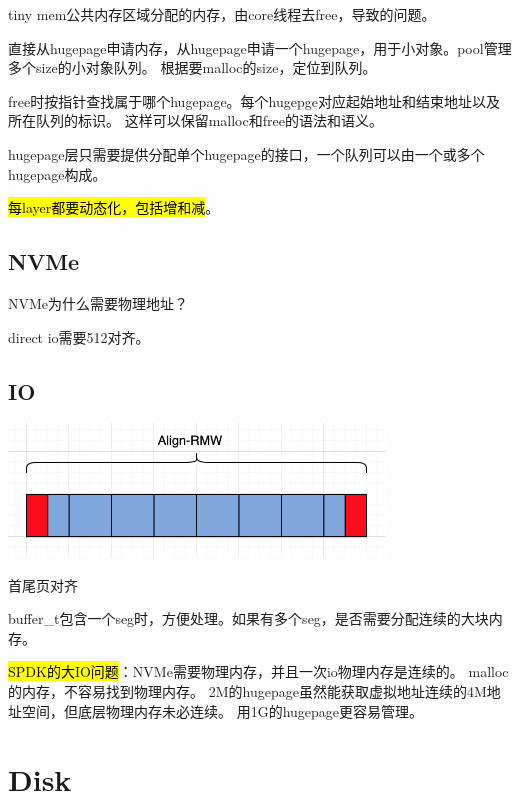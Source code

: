 tiny mem公共内存区域分配的内存，由core线程去free，导致的问题。

直接从hugepage申请内存，从hugepage申请一个hugepage，用于小对象。pool管理多个size的小对象队列。
根据要malloc的size，定位到队列。

free时按指针查找属于哪个hugepage。每个hugepge对应起始地址和结束地址以及所在队列的标识。
这样可以保留malloc和free的语法和语义。

hugepage层只需要提供分配单个hugepage的接口，一个队列可以由一个或多个hugepage构成。


\hl{每layer都要动态化，包括增和减}。

\subsection{NVMe}

NVMe为什么需要物理地址？

direct io需要512对齐。

\subsection{IO}

\begin{center}
\includegraphics[width=10cm]{../imgs/io-align.png}
\end{center}

首尾页对齐 

buffer\_t包含一个seg时，方便处理。如果有多个seg，是否需要分配连续的大块内存。

\hl{SPDK的大IO问题}：NVMe需要物理内存，并且一次io物理内存是连续的。
malloc的内存，不容易找到物理内存。
2M的hugepage虽然能获取虚拟地址连续的4M地址空间，但底层物理内存未必连续。
用1G的hugepage更容易管理。

\section{Disk}

